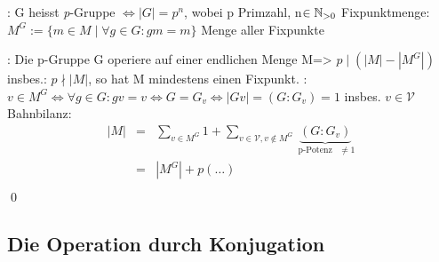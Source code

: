 :{
  G heisst {\emph p-Gruppe} $\Leftrightarrow |G| = p^n$, wobei p Primzahl, n$\in \mathbb N_{>0}$}
 Fixpunktmenge:{ 
  $M^G :=\{m\in M \mid \forall g\in G: gm = m \}$ \hfill Menge aller Fixpunkte
  }

:{
  Die p-Gruppe G operiere auf einer endlichen Menge M}=>{
  $p \mid (|M| - |M^G|)$ \\
  insbes.: $p \nmid |M|$, so hat M mindestens einen Fixpunkt.
							}
\proof{}:{ $ v \in M^G \Leftrightarrow \forall g \in G: gv = v \Leftrightarrow G = G_v \Leftrightarrow
  |Gv| = (G:G_v) = 1$ insbes. $v \in \mathcal{V}$\\
  Bahnbilanz: \\ 
  \begin{eqnarray*}
    |M| & = &  \sum_{v \in M^G} 1 +  \sum_{v \in \mathcal{V}, v \not\in M^G}
	\underbrace{(G:G_v)}_{\operatorname{p-Potenz \enspace} \neq 1} \nonumber \\
	& = & |M^G| +               p(\ldots) \\
  \end{eqnarray*}
  \hfill \qed		  
	  }


\subsection {Die Operation durch Konjugation}

